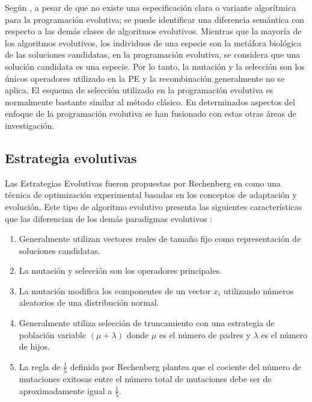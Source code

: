 Según \cite{weise2009global}, a pesar de que no existe una especificación clara o variante algorítmica para la programación evolutiva; se puede identificar una diferencia semántica con respecto a las demás clases de algoritmos evolutivos. Mientras que la mayoría de los algoritmos evolutivos, los individuos de una especie son la metáfora biológica de las soluciones candidatas, en la programación evolutiva, se considera que una solución candidata es una especie. Por lo tanto, la mutación y la selección son los únicos operadores utilizado en la PE y la recombinación generalmente no se aplica. El esquema de selección utilizado en la programación evolutiva es normalmente bastante similar al método clásico. En determinados aspectos del enfoque de la programación evolutiva se han fusionado con estas otras áreas de investigación.


\subsection{Estrategia evolutivas}
Las Estrategias Evolutivas fueron propuestas por Rechenberg en \cite{rechenberg1973evolution} como una técnica de optimización experimental basadas en los conceptos de adaptación y evolución. Este tipo de algoritmo evolutivo presenta las siguientes características que las diferencian de los demás paradigmas evolutivos \cite{schwefel1995contemporary} \cite{weise2009global}:
\begin{enumerate}
\item Generalmente utilizan vectores reales de tamaño fijo como representación de soluciones candidatas.
\item La mutación y selección son los operadores principales.
\item La mutación modifica los componentes de un vector $x_i$ utilizando números aleatorios de una distribución normal.
\item Generalmente utiliza selección de truncamiento con una estrategia de población variable 
$(\mu+\lambda)$ donde $\mu$ es el número de padres y $\lambda$ es el número de hijos.
\item La regla de $\frac{1}{5}$ definida por Rechenberg plantea que el cociente del número de mutaciones exitosas entre el número total de mutaciones debe ser de aproximadamente igual a $\frac{1}{5}$. 
\end{enumerate}

